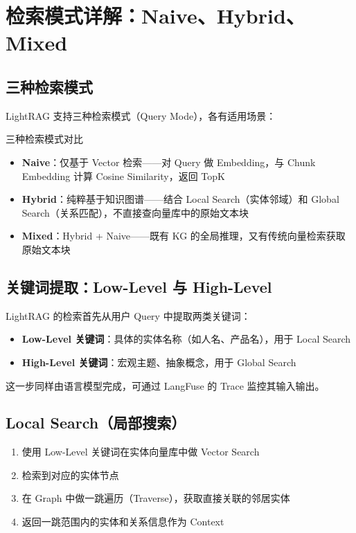 \section{检索模式详解：Naive、Hybrid、Mixed}

\subsection{三种检索模式}

LightRAG 支持三种检索模式（Query Mode），各有适用场景：

\begin{importantbox}{三种检索模式对比}
\begin{itemize}
    \item \textbf{Naive}：仅基于 Vector 检索——对 Query 做 Embedding，与 Chunk Embedding 计算 Cosine Similarity，返回 TopK
    \item \textbf{Hybrid}：纯粹基于知识图谱——结合 Local Search（实体邻域）和 Global Search（关系匹配），不直接查向量库中的原始文本块
    \item \textbf{Mixed}：Hybrid + Naive——既有 KG 的全局推理，又有传统向量检索获取原始文本块
\end{itemize}
\end{importantbox}

\subsection{关键词提取：Low-Level 与 High-Level}

LightRAG 的检索首先从用户 Query 中提取两类关键词：

\begin{itemize}
    \item \textbf{Low-Level 关键词}：具体的实体名称（如人名、产品名），用于 Local Search
    \item \textbf{High-Level 关键词}：宏观主题、抽象概念，用于 Global Search
\end{itemize}

这一步同样由语言模型完成，可通过 LangFuse 的 Trace 监控其输入输出。

\subsection{Local Search（局部搜索）}

\begin{enumerate}
    \item 使用 Low-Level 关键词在实体向量库中做 Vector Search
    \item 检索到对应的实体节点
    \item 在 Graph 中做一跳遍历（Traverse），获取直接关联的邻居实体
    \item 返回一跳范围内的实体和关系信息作为 Context
\end{enumerate}

